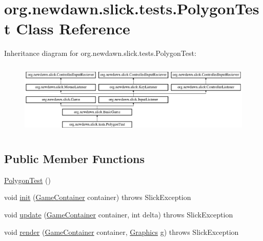 \hypertarget{classorg_1_1newdawn_1_1slick_1_1tests_1_1_polygon_test}{}\section{org.\+newdawn.\+slick.\+tests.\+Polygon\+Test Class Reference}
\label{classorg_1_1newdawn_1_1slick_1_1tests_1_1_polygon_test}
Inheritance diagram for org.\+newdawn.\+slick.\+tests.\+Polygon\+Test\+:\begin{figure}[H]
\begin{center}
\leavevmode
\includegraphics[height=3.522012cm]{classorg_1_1newdawn_1_1slick_1_1tests_1_1_polygon_test}
\end{center}
\end{figure}
\subsection*{Public Member Functions}
\begin{DoxyCompactItemize}
\item 
\mbox{\hyperlink{classorg_1_1newdawn_1_1slick_1_1tests_1_1_polygon_test_ac067fe625dbe2ba4c96e8cb7d94252ca}{Polygon\+Test}} ()
\item 
void \mbox{\hyperlink{classorg_1_1newdawn_1_1slick_1_1tests_1_1_polygon_test_a61bd34b76fb509d02e93e4b6ccdc8d2e}{init}} (\mbox{\hyperlink{classorg_1_1newdawn_1_1slick_1_1_game_container}{Game\+Container}} container)  throws Slick\+Exception 
\item 
void \mbox{\hyperlink{classorg_1_1newdawn_1_1slick_1_1tests_1_1_polygon_test_a083755d80e156800da238c166f908cf8}{update}} (\mbox{\hyperlink{classorg_1_1newdawn_1_1slick_1_1_game_container}{Game\+Container}} container, int delta)  throws Slick\+Exception 
\item 
void \mbox{\hyperlink{classorg_1_1newdawn_1_1slick_1_1tests_1_1_polygon_test_a2db8017248967b5312c24a086a1543ec}{render}} (\mbox{\hyperlink{classorg_1_1newdawn_1_1slick_1_1_game_container}{Game\+Container}} container, \mbox{\hyperlink{classorg_1_1newdawn_1_1slick_1_1_graphics}{Graphics}} g)  throws Slick\+Exception 
\end{DoxyCompactItemize}
